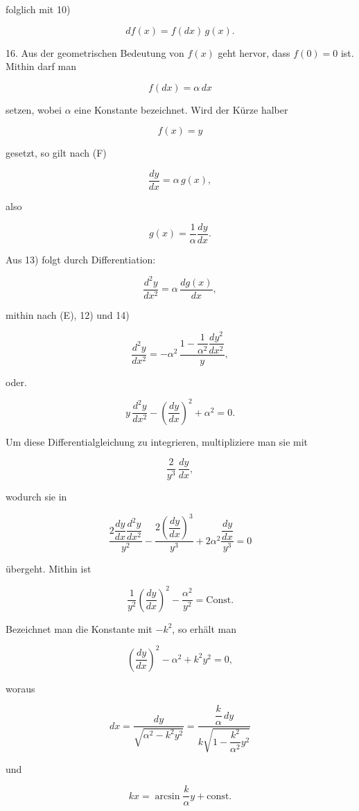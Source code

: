 %
\noindent folglich mit 10)

\[
\tag*{(F)} df(x) = f(dx)\, g(x).
\]

16. Aus der geometrischen Bedeutung von $f(x)$ geht hervor, dass $f(0) = 0$ ist. Mithin darf man

\[
\tag*{12)} f(dx) = \alpha\, dx
\]

setzen, wobei $\alpha$ eine Konstante bezeichnet. Wird der Kürze halber

\[
f(x) = y
\]

\noindent gesetzt, so gilt nach (F)

\[
\tag*{13)} \frac{dy}{dx} = \alpha\, g(x),
\]

also

\[
\tag*{14)} g(x) = \frac{1}{\alpha}\frac{dy}{dx}.
\]

Aus 13) folgt durch Differentiation:

\[
\frac{d^2y}{dx^2} = \alpha\, \frac{dg(x)}{dx},
\]

mithin nach (E), 12) und 14)

\[
\frac{d^2y}{dx^2} = -\alpha^2\, \frac{1 - \dfrac{1}{\alpha^2}\dfrac{dy^2}{dx^2}}{y},
\]

oder.

\[
\tag*{15)} y\, \frac{d^2y}{dx^2} - \left(\frac{dy}{dx}\right)^2 + \alpha^2 = 0.
\]

Um diese Differentialgleichung zu integrieren, multipliziere man sie mit

\[
\frac{2}{y^3}\, \frac{dy}{dx},
\]

wodurch sie in

\[
\frac{2\dfrac{dy}{dx}\dfrac{d^2y}{dx^2}}{y^2} - \frac{2\left(\dfrac{dy}{dx}\right)^3}{y^3} + 2\alpha^2\frac{\dfrac{dy}{dx}}{y^3} = 0
\]

übergeht. Mithin ist

\[
\frac{1}{y^2}\left(\frac{dy}{dx}\right)^2 - \frac{\alpha^2}{y^2} = \text{Const.}
\]

Bezeichnet man die Konstante mit $-k^2$, so erhält man

\[
\left(\frac{dy}{dx}\right)^2 - \alpha^2 + k^2 y^2 = 0,
\]

\noindent woraus

\[
dx = \frac{dy}{\sqrt{\alpha^2 - k^2 y^2}} = \frac{\dfrac{k}{\alpha}\, dy}{k\sqrt{1 - \dfrac{k^2}{\alpha^2} y^2}}
\]

und

\[
kx = \arcsin \frac{k}{\alpha} y + \text{const.}
\]
